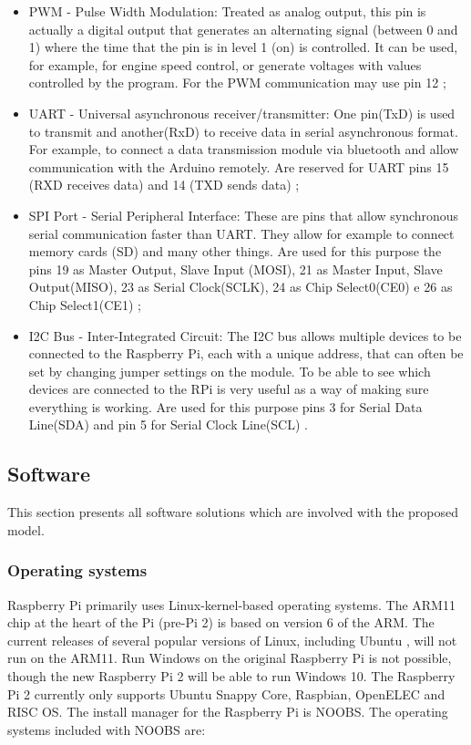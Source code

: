 \documentclass{acm_proc_article-sp}
\begin{document}
\begin{itemize}

\item PWM - Pulse Width Modulation: Treated as analog output, this pin is actually a digital output that generates an alternating signal (between 0 and 1) where the time that the pin is in level 1 (on) is controlled. It can be used, for example, for engine speed control, or generate voltages with values controlled by the program. For the PWM communication may use pin 12 \cite{barr2001pulse};

\item UART - Universal asynchronous receiver/transmitter: One pin(TxD) is used to transmit and another(RxD) to receive data in serial asynchronous format. For example, to connect a data transmission module via bluetooth and allow communication with the Arduino remotely. Are reserved for UART pins 15 (RXD receives data) and 14 (TXD sends data) \cite{Uart};

\item SPI Port - Serial Peripheral Interface: These are pins that allow synchronous serial communication faster than UART. They allow for example to connect memory cards (SD) and many other things. Are used for this purpose the pins 19 as Master Output, Slave Input (MOSI), 21 as Master Input, Slave Output(MISO), 23 as Serial Clock(SCLK), 24 as Chip Select0(CE0) e 26 as Chip Select1(CE1) \cite{Spi};


\item I2C Bus - Inter-Integrated Circuit: The I2C bus allows multiple devices to be connected to the Raspberry Pi, each with a unique address, that can often be set by changing jumper settings on the module. To be able to see which devices are connected to the RPi is very useful as a way of making sure everything is working. Are used for this purpose pins 3 for Serial Data Line(SDA) and pin 5 for Serial Clock Line(SCL) \cite{I2c}.

\end{itemize}

\subsection{Software}
This section presents all software solutions which are involved with the proposed model.

\subsubsection{Operating systems}
Raspberry Pi primarily uses Linux-kernel-based operating systems. The ARM11 chip at the heart of the Pi (pre-Pi 2) is based on version 6 of the ARM. The current releases of several popular versions of Linux, including Ubuntu \cite{Gareth}, will not run on the ARM11. Run Windows on the original Raspberry Pi is not possible, though the new Raspberry Pi 2 will be able to run Windows 10\cite{Kevin}. The Raspberry Pi 2 currently only supports Ubuntu Snappy Core, Raspbian, OpenELEC and RISC OS.
\newline
\newline
The install manager for the Raspberry Pi is NOOBS. The operating systems included with NOOBS are:
\end{document}

